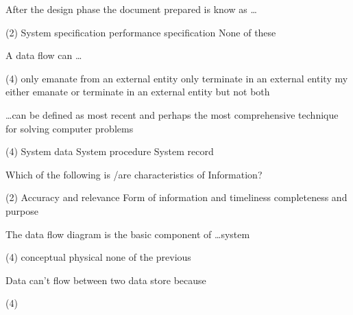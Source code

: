 \documentclass{article}
\begin{document}
\begin{questions}
\begin{exercise}
        After the design phase the document prepared is know as \dots
        \begin{choice}(2)
            \choice System specification
            \choice performance specification
            \choice {}
            \choice None of these
        \end{choice}
    \end{exercise}
    \begin{exercise}
        A data flow can \dots
        \begin{choice}(4)
            \choice only emanate from an external entity
            \choice only terminate in an external entity
            \choice {}
            \choice my either emanate or terminate in an external entity but not both
        \end{choice}
    \end{exercise}
    \begin{exercise}
        \dots can be defined as most recent and perhaps the most comprehensive technique for solving computer problems
        \begin{choice}(4)
            \choice {}
            \choice System data
            \choice System procedure
            \choice System record
        \end{choice}
    \end{exercise}
    \begin{exercise}
        Which of the following is /are characteristics of Information?
        \begin{choice}(2)
            \choice Accuracy and relevance
            \choice Form of information and timeliness
            \choice completeness and purpose
            \choice {}
        \end{choice}
    \end{exercise}
    \begin{exercise}
        The data flow diagram is the basic component of \dots system
        \begin{choice}(4)
            \choice conceptual
            \choice {}
            \choice physical
            \choice none of the previous
        \end{choice}
    \end{exercise}
    \begin{exercise}
        Data can't flow between two data store because
        \begin{choice}(4)

\end{choice}
\end{exercise}
\end{questions}
\end{document}
